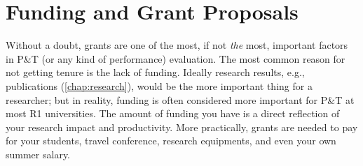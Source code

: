 \documentclass[oneside,11pt,dvipsnames]{book}
\begin{document}














\chapter{Funding and Grant Proposals}\label{chap}
Without a doubt, grants are one of the most, if not \emph{the} most, important factors in P\&T (or any kind of performance) evaluation.  The most common reason for not getting tenure is the lack of funding. Ideally research results, e.g., publications (\autoref{chap:research}), would be the more important thing for a researcher; but in reality, funding is often considered more important for P\&T at most R1 universities.
The amount of funding you have is a direct reflection of your research impact and productivity. More practically, grants are needed to pay for your students, travel conference, research equipments, and even your own summer salary.
\end{document}
